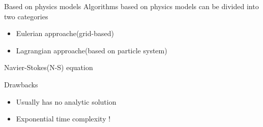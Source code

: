 \documentclass{beamer}
\begin{document}
\begin{frame}{Based on physics models}
  Algorithms based on physics models can be divided into two categories
  \begin{itemize}
    \item Eulerian approache(grid-based)
    \item Lagrangian approache(based on particle system)
  \end{itemize}

  \begin{figure}[thpb]
    \centering
  \label{fig:system}
  \end{figure}
\end{frame}
\begin{frame}{Navier-Stokes(N-S) equation}
  \begin{figure}[thpb]
    \centering
  \label{fig:system}
  \end{figure}
  \textcolor[rgb]{0,0,1}{Drawbacks}
  \begin{itemize}
    \item Usually has no analytic solution
    \item Exponential time complexity !
  \end{itemize}
\end{frame}
\end{document}
